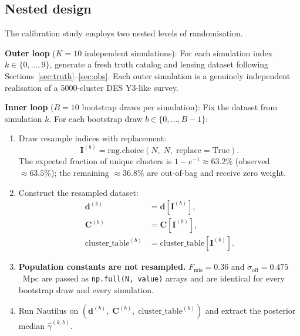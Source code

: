 \documentclass[11pt,a4paper]{article}
\begin{document}
\subsection{Nested design}
\label{sec:design}

The calibration study employs two nested levels of randomisation.

\textbf{Outer loop} ($K = 10$ independent simulations):
For each simulation index $k \in \{0,\ldots,9\}$, generate a fresh truth catalog
and lensing dataset following Sections~\ref{sec:truth}--\ref{sec:obs}.
Each outer simulation is a genuinely independent realisation of a 5000-cluster
DES Y3-like survey.

\textbf{Inner loop} ($B = 10$ bootstrap draws per simulation):
Fix the dataset from simulation $k$.  For each bootstrap draw $b \in \{0,\ldots,B-1\}$:

\begin{enumerate}
  \item Draw resample indices with replacement:
        \begin{equation}
          \mathbf{I}^{(b)} = \mathrm{rng.choice}(N,\;N,\;\mathrm{replace}=\mathrm{True}).
        \end{equation}
        The expected fraction of unique clusters is $1 - e^{-1} \approx 63.2\%$
        (observed $\approx 63.5\%$); the remaining $\approx 36.8\%$ are
        out-of-bag and receive zero weight.

  \item Construct the resampled dataset:
        \begin{align}
          \mathbf{d}^{(b)} &= \mathbf{d}[\mathbf{I}^{(b)}],\\
          \mathbf{C}^{(b)} &= \mathbf{C}[\mathbf{I}^{(b)}],\\
          \mathrm{cluster\_table}^{(b)} &= \mathrm{cluster\_table}[\mathbf{I}^{(b)}].
        \end{align}

  \item \textbf{Population constants are not resampled.}
        $F_\mathrm{mis} = 0.36$ and $\sigma_\mathrm{off} = 0.475$~Mpc are
        passed as \texttt{np.full(N, value)} arrays and are identical for
        every bootstrap draw and every simulation.

  \item Run Nautilus on
        $(\mathbf{d}^{(b)},\;\mathbf{C}^{(b)},\;\mathrm{cluster\_table}^{(b)})$
        and extract the posterior median $\hat\gamma^{(k,b)}$.
\end{enumerate}
\end{document}
